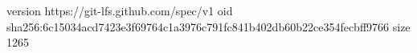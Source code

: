 version https://git-lfs.github.com/spec/v1
oid sha256:6c15034acd7423e3f69764c1a3976c791fc841b402db60b22ce354fecbff9766
size 1265
